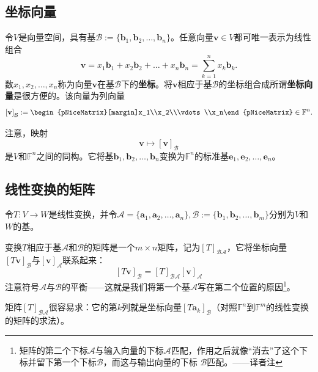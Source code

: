 \subsection{坐标向量}

令$V$是向量空间，具有基$\mathcal{B}:=\{\mathbf{b}_1,\mathbf{b}_2,\ldots,\mathbf{b}_n\}$。任意向量$\mathbf{v}\in V$都可唯一表示为线性组合\[\mathbf{v}=x_1\mathbf{b}_1+x_2\mathbf{b}_2+\ldots+x_n\mathbf{b}_n=\sum_{k=1}^nx_k\mathbf{b}_k.\]
数$x_1,x_2,\ldots,x_n$称为向量$\mathbf{v}$在基$\mathcal{B}$下的{\bf 坐标}。将$\mathbf{v}$相应于基$\mathcal{B}$的坐标组合成所谓\textbf{坐标向量}是很方便的。该向量为列向量\[\left[\mathbf{v}\right]_{\mathcal{B}}:=\begin{pNiceMatrix}[margin]x_1\\x_2\\\vdots\\x_n\end{pNiceMatrix}\in\mathbb{F}^n.\]

注意，映射\[\mathbf{v}\mapsto\left[\mathbf{v}\right]_{\mathcal{B}}\]
是$V$和$\mathbb{F}^n$之间的同构。它将基$\mathbf{b}_1,\mathbf{b}_2,\ldots,\mathbf{b}_n$变换为$\mathbb{F}^{n}$的标准基$\mathbf{e}_{1},\mathbf{e}_{2},\ldots,\mathbf{e}_{n}$。

\subsection{线性变换的矩阵}

令$T:V\to W$是线性变换，并令$\mathcal{A}=\{\mathbf{a}_{1},\mathbf{a}_{2},\ldots,\mathbf{a}_{n}\},\mathcal{B}:=\{\mathbf{b}_{1},\mathbf{b}_{2},\ldots,\mathbf{b}_{m}\}$分别为$V$和$W$的基。

变换$T$相应于基$\mathcal{A}$和$\mathcal{B}$的矩阵是一个$m\times n$矩阵，记为$[T]_{\mathcal{BA}}$，它将坐标向量$\left[T\mathbf{v}\right]_{\mathcal{B}}$与$\left[\mathbf{v}\right]_{\mathcal{A}}$联系起来：\[[T\mathbf{v}]_{\mathcal{B}}=[T]_{\mathcal{BA}}[\mathbf{v}]_{\mathcal{A}}\]
注意符号$\mathcal{A}$与$\mathcal{B}$的平衡——这就是我们将第一个基$\mathcal{A}$写在第二个位置的原因\footnote{矩阵的第二个下标$\mathcal{A}$与输入向量的下标$\mathcal{A}$匹配，作用之后就像“消去”了这个下标并留下第一个下标$\mathcal{B}$，而这与输出向量的下标 $\mathcal{B}$匹配。——译者注}。

矩阵$[T]_{\mathcal{BA}}$很容易求：它的第$k$列就是坐标向量$\left[T\mathbf{a}_k\right]_{\mathcal{B}}$（对照$\mathbb{F}^n$到$\mathbb{F}^m$的线性变换的矩阵的求法）。

